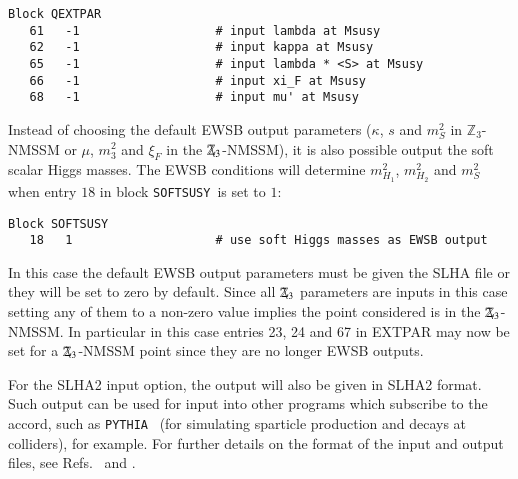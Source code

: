 \documentclass[final,3p,times,pdflatex]{elsarticle}
\def\SOFTSUSY{{\tt SOFTSUSY}}
\def\code#1{\small{\tt #1}\normalsize}
\newcommand{\Zv}{\,\mathbf{\backslash}\mkern-11.0mu{\mathbb{Z}}_{3}} %
\begin{document}
%
\begin{verbatim}
Block QEXTPAR
   61   -1                   # input lambda at Msusy
   62   -1                   # input kappa at Msusy
   65   -1                   # input lambda * <S> at Msusy
   66   -1                   # input xi_F at Msusy
   68   -1                   # input mu' at Msusy
\end{verbatim}
%
Instead of choosing the default EWSB output parameters ($\kappa$, $s$ and $m_S^2$ in $\mathbb{Z}_3$-NMSSM or $\mu$, $m_3^2$ and $\xi_F$ in the $\Zv$-NMSSM), it is also possible output the soft scalar Higgs masses.  The EWSB conditions will determine $m_{H_1}^2$, $m_{H_2}^2$ and $m_S^2$ when entry $18$ in block \SOFTSUSY\ is set to $1$: 
%
\begin{verbatim}
Block SOFTSUSY
   18   1                    # use soft Higgs masses as EWSB output
\end{verbatim}

In this case the default EWSB output parameters must be given the SLHA file or they will be set to zero by default. Since all $\Zv$ parameters are inputs in this case setting any of them to a non-zero value implies the point considered is in the $\Zv$-NMSSM. In particular in this case entries 23, 24 and 67 in EXTPAR may now be set for a $\Zv$-NMSSM point since they are no longer EWSB outputs.

For the SLHA2 input option, 
the output will also be given in 
SLHA2 format. Such output can be used for
input into other programs which subscribe to the accord, such as
\code{PYTHIA}~\cite{Sjostrand:2007gs} (for
simulating sparticle production and decays at colliders), for example. For
further details on the format of 
the input and output files, see Refs.~\cite{Allanach:2008qq} and
\cite{Skands:2003cj}. 
\end{document}
